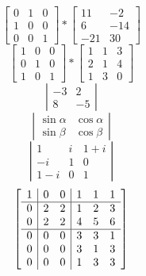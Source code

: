 \documentclass{article}
\begin{document}
\begin{equation}
	\left[
	\begin{array}{ccc}
	0&1&0 \\
	1&0&0 \\
	0&0&1
	\end{array}
	\right]
	*
	\left[
	\begin{array}{cc}
	11&-2 \\
	6&-14 \\
	-21&30
	\end{array}
	\right]
\end{equation}
\begin{equation}
	\left[
	\begin{array}{ccc}
	1&0&0 \\
	0&1&0 \\
	1&0&1
	\end{array}
	\right]
	*
	\left[
	\begin{array}{ccc}
	1&1&3 \\
	2&1&4 \\
	1&3&0
	\end{array}
	\right]
\end{equation}
\begin{equation}
	\left|
	\begin{array}{cc}
	-3&2 \\
	8&-5
	\end{array}
	\right|
\end{equation}
\begin{equation}
	\left|
	\begin{array}{cc}
	\sin \alpha & \cos \alpha \\
	\sin \beta & \cos \beta
	\end{array}
	\right|
\end{equation}
\begin{equation}
 	\left|
 	\begin{array}{ccc}
 	1&i&1+i \\
 	-i&1&0 \\
 	1-i&0&1
 	\end{array}
 	\right|
\end{equation}
\begin{equation}
 	\left[
 	\begin{array}{c | cc | ccc}
 	1&0&0&1&1&1 \\
 	\hline
 	0&2&2&1&2&3 \\
 	0&2&2&4&5&6 \\
 	\hline
 	0&0&0&3&3&1 \\
 	0&0&0&3&1&3 \\
 	0&0&0&1&3&3
 	\end{array}
 	\right]
\end{equation}
\end{document}
